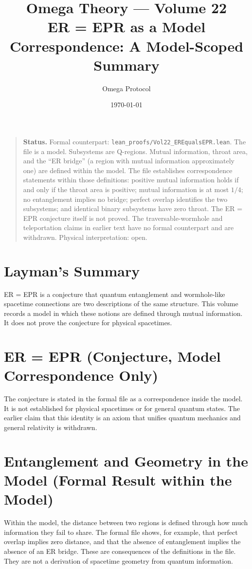 \documentclass[11pt, a4paper]{article}
\title{Omega Theory --- Volume 22\\\Large ER = EPR as a Model Correspondence: A Model-Scoped Summary}
\author{Omega Protocol}
\date{\today}
\begin{document}
\maketitle

\begin{quote}
\textbf{Status.} Formal counterpart: \texttt{lean\_proofs/Vol22\_EREqualsEPR.lean}. The file is a model. Subsystems are Q-regions. Mutual information, throat area, and the ``ER bridge'' (a region with mutual information approximately one) are defined within the model. The file establishes correspondence statements within those definitions: positive mutual information holds if and only if the throat area is positive; mutual information is at most $1/4$; no entanglement implies no bridge; perfect overlap identifies the two subsystems; and identical binary subsystems have zero throat. The ER = EPR conjecture itself is not proved. The traversable-wormhole and teleportation claims in earlier text have no formal counterpart and are withdrawn. Physical interpretation: open.
\end{quote}

\section*{Layman's Summary}
ER = EPR is a conjecture that quantum entanglement and wormhole-like spacetime connections are two descriptions of the same structure. This volume records a model in which these notions are defined through mutual information. It does not prove the conjecture for physical spacetimes.

\section{ER = EPR (Conjecture, Model Correspondence Only)}
The conjecture is stated in the formal file as a correspondence inside the model. It is not established for physical spacetimes or for general quantum states. The earlier claim that this identity is an axiom that unifies quantum mechanics and general relativity is withdrawn.

\section{Entanglement and Geometry in the Model (Formal Result within the Model)}
Within the model, the distance between two regions is defined through how much information they fail to share. The formal file shows, for example, that perfect overlap implies zero distance, and that the absence of entanglement implies the absence of an ER bridge. These are consequences of the definitions in the file. They are not a derivation of spacetime geometry from quantum information.
\end{document}

